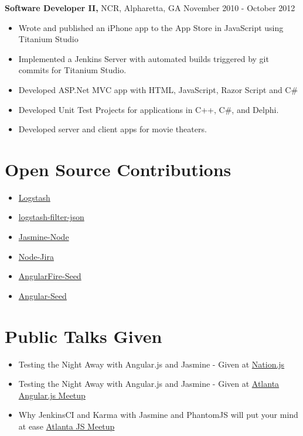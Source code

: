 \documentclass[margin]{res}
\begin{document}
\begin{resume}
    {\bf Software Developer II,} NCR, Alpharetta, GA \hfill November 2010 - October
    2012
        \begin{itemize} \itemsep -2pt
            \item Wrote and published an iPhone app to the App Store in JavaScript
                using Titanium Studio
            \item Implemented a Jenkins Server with automated builds triggered by
                git commits for Titanium Studio.
            \item Developed ASP.Net MVC app with HTML, JavaScript, Razor Script and
                C\#
            \item Developed Unit Test Projects for applications in C++, C\#, and
                Delphi.
            \item Developed server and client apps for movie theaters.
        \end{itemize}

\section{Open Source Contributions}
    \begin{itemize}
        \item \href{https://github.com/elastic/logstash}{Logstash}
        \item \href{https://github.com/logstash-plugins/logstash-filter-json}{logstash-filter-json}
        \item \href{https://github.com/mhevery/jasmine-node}{Jasmine-Node}
        \item \href{https://github.com/steves/node-jira}{Node-Jira}
        \item \href{https://github.com/firebase/angularFire-seed}{AngularFire-Seed}
        \item \href{https://github.com/angular/angular-seed}{Angular-Seed}
    \end{itemize}

\section{Public Talks Given}
    \begin{itemize}
        \item Testing the Night Away with Angular.js and Jasmine - Given at
            \href{http://nationjs.com/}{Nation.js}
        \item Testing the Night Away with Angular.js and Jasmine - Given at
            \href{http://www.meetup.com/AngularJS-ATL/}{Atlanta Angular.js Meetup}
        \item Why JenkinsCI and Karma with Jasmine and PhantomJS will put your
            mind at ease \href{http://www.meetup.com/AtlantaJavaScript/}{Atlanta JS Meetup}
    \end{itemize}


\end{resume}
\end{document}

